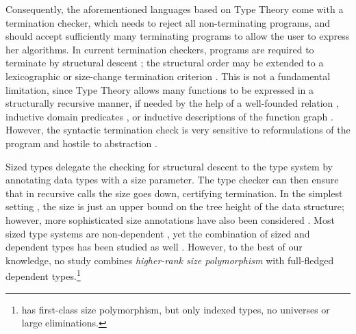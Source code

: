 \documentclass[acmsmall%
]{acmart}\settopmatter{printfolios=true}
\begin{document}
Consequently, the aforementioned languages based on Type Theory come with a termination checker, which needs to reject all non-terminating programs, and should accept sufficiently many terminating programs to allow the user to express her algorithms.  In current termination checkers, programs are required to terminate by structural descent \cite{gimenez:guardeddefinitions}; the structural order may be extended to a lexicographic \cite{abelAltenkirch:jfp02} or size-change termination criterion \cite{jones:sizeChange,wahlstedt:PhD}.  This is not a fundamental limitation, since Type Theory allows many functions to be expressed in a structurally recursive manner, if needed by the help of a well-founded relation \cite{nordstrom:genrec}, inductive domain predicates \cite{boveCapretta:mscs05}, or inductive descriptions of the function graph \cite{bove:entcs09}.  However, the syntactic termination check is very sensitive to reformulations of the program and hostile to abstraction \cite{abel:fics12}.

Sized types \cite{hughesParetoSabry:popl96} delegate the checking for structural descent to the type system by annotating data types with a size parameter.  The type checker can then ensure that in recursive calls the size goes down, certifying termination.  In the simplest setting \cite{gimenez:typeBased,abel:lmcs07}, the size is just an upper bound on the tree height of the data structure; however, more sophisticated size annotations have also been considered \cite{xi:terminationHOSC,blanqui:rta04}.  Most sized type systems are non-dependent \cite{amadio:guardcondition,abelPientka:jfp16,bartheGregoireRiba:lernet08,bartheGregoireRiba:csl08,blanquiRiba:lpar06,dalLagoGrellois:esop17}, yet the combination of sized and dependent types has been studied as well \cite{blanqui:csl05,bartheGregoirePastawski:lpar06,gregoireSacchini:lpar10,sacchini:lics13,sacchini:flops14}.  However, to the best of our knowledge, no study combines \emph{higher-rank size polymorphism} with full-fledged dependent types.\footnote{\citet{xi:terminationHOSC} has first-class size polymorphism, but only indexed types, no universes or large eliminations.}
\end{document}

